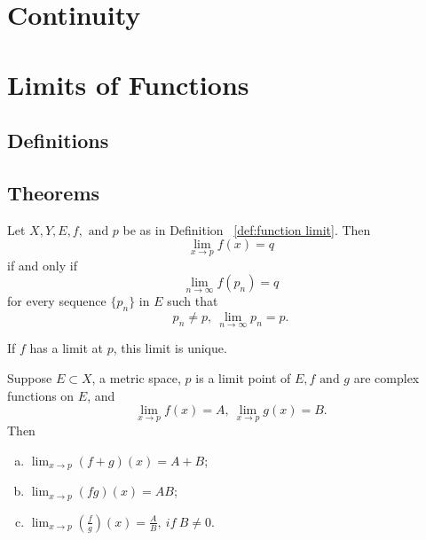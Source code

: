 \section{Continuity}

\section{Limits of Functions}
\subsection{Definitions}

\subsection{Theorems}
\begin{thm}
	Let $X, Y, E, f, \mbox{ and } p$ be as in Definition ~\ref{def:function limit}. Then $$\lim_{x \to p} f(x) = q$$ if and only if $$\lim_{n \to \infty} f(p_n) = q$$ for every sequence $\{p_n\}$ in $E$ such that $$p_n \ne p, ~\lim_{n \to \infty}p_n = p.$$
\end{thm}

\begin{cor}
	If $f$ has a limit at $p$, this limit is unique.
\end{cor}

\begin{thm}
	Suppose $E \subset X$, a metric space, $p$ is a limit point of $E, f \mbox{ and } g$ are complex functions on $E$, and $$\lim_{x \to p}f(x) = A, ~ \lim_{x \to p} g(x) = B.$$ Then
	\begin{enumerate}[(a)]
		\item $\lim_{x \to p} (f+g)(x) = A + B$;
		\item $\lim_{x \to p} (fg)(x) = AB$;
		\item $\lim_{x \to p} (\frac{f}{g})(x) = \frac{A}{B}, ~ if ~ B \ne 0$.
	\end{enumerate}
\end{thm}

